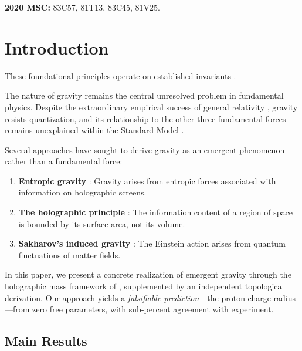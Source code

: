 \documentclass[12pt, a4paper]{article}
\theoremstyle{plain}
\theoremstyle{definition}
\theoremstyle{remark}
\begin{document}
\vspace{0.5em}
\noindent\textbf{2020 MSC:} 83C57, 81T13, 83C45, 81V25.

\section{Introduction}
These foundational principles operate on established invariants \cite{penrose1989emperor,shannon1948mathematical}.\label{sec:intro}

The nature of gravity remains the central unresolved problem in fundamental
physics. Despite the extraordinary empirical success of general relativity
\citep{Einstein1915}, gravity resists quantization, and its relationship to
the other three fundamental forces remains unexplained within the Standard
Model \citep{Weinberg1995}.

Several approaches have sought to derive gravity as an emergent phenomenon
rather than a fundamental force:
\begin{enumerate}[label=(\roman*)]
  \item \textbf{Entropic gravity} \citep{Verlinde2011}: Gravity arises from
    entropic forces associated with information on holographic screens.
  \item \textbf{The holographic principle} \citep{tHooft1993, Susskind1995}:
    The information content of a region of space is bounded by its surface
    area, not its volume.
  \item \textbf{Sakharov's induced gravity} \citep{Sakharov1968}: The Einstein
    action arises from quantum fluctuations of matter fields.
\end{enumerate}

In this paper, we present a concrete realization of emergent gravity through
the holographic mass framework of \citet{Haramein2023}, supplemented by
an independent topological derivation. Our approach yields a
\emph{falsifiable prediction}---the proton charge radius---from zero free
parameters, with sub-percent agreement with experiment.

\subsection{Main Results}
\end{document}
